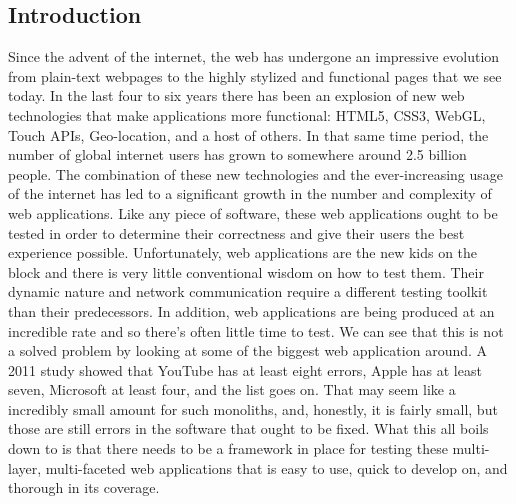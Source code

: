 \documentclass[11pt]{article}
\begin{document}
\begin{multicols}{2}
\setcounter{page}{1}

\section{Introduction}
Since the advent of the internet, the web has undergone an impressive evolution from plain-text webpages to the highly stylized and functional pages that we see today. In the last four to six years there has been an explosion of new web technologies that make applications more functional: HTML5, CSS3, WebGL, Touch APIs, Geo-location, and a host of others. \cite{EvolutionOfWeb} In that same time period, the number of global internet users has grown to somewhere around 2.5 billion people. \cite{EvolutionOfWeb} The combination of these new technologies and the ever-increasing usage of the internet has led to a significant growth in the number and complexity of web applications.
Like any piece of software, these web applications ought to be tested in order to determine their correctness and give their users the best experience possible. Unfortunately, web applications are the new kids on the block and there is very little conventional wisdom on how to test them. Their dynamic nature and network communication require a different testing toolkit than their predecessors. In addition, web applications are being produced at an incredible rate and so there's often little time to test.
We can see that this is not a solved problem by looking at some of the biggest web application around. A 2011 study showed that YouTube has at least eight errors, Apple has at least seven, Microsoft at least four, and the list goes on. \cite{ErrorsInTheWild} That may seem like a incredibly small amount for such monoliths, and, honestly, it is fairly small, but those are still errors in the software that ought to be fixed.
What this all boils down to is that there needs to be a framework in place for testing these multi-layer, multi-faceted web applications that is easy to use, quick to develop on, and thorough in its coverage. 


\end{multicols}
\end{document}
